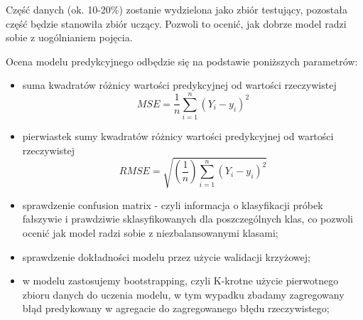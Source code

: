 Część danych (ok. 10-20\%) zostanie wydzielona jako zbiór testujący, pozostała część będzie stanowiła zbiór uczący. Pozwoli to ocenić, jak dobrze model radzi sobie z uogólnianiem pojęcia. 

Ocena modelu predykcyjnego odbędzie się na podstawie poniższych parametrów:
\begin{itemize}
    \item suma kwadratów różnicy wartości predykcyjnej od wartości rzeczywistej
    \begin{equation}
    MSE = {\frac{1}{n}\sum_{i=1}^{n}(Y_{i} - y_{i})^{2}}
    \end{equation}
    \item pierwiastek sumy kwadratów różnicy wartości predykcyjnej od wartości rzeczywistej
    \begin{equation}
    RMSE = \sqrt{(\frac{1}{n})\sum_{i=1}^{n}(Y_{i} - y_{i})^{2}}
    \end{equation}
    \item sprawdzenie confusion matrix - czyli informacja o klasyfikacji próbek fałszywie i prawdziwie sklasyfikowanych dla poszczególnych klas, co pozwoli ocenić jak model radzi sobie z niezbalansowanymi klasami;
    \item sprawdzenie dokładności modelu przez użycie walidacji krzyżowej;
    \item w modelu zastosujemy bootstrapping, czyli K-krotne użycie pierwotnego zbioru danych do uczenia modelu, w tym wypadku zbadamy zagregowany błąd predykowany w agregacie do zagregowanego błędu rzeczywistego;
\end{itemize}
